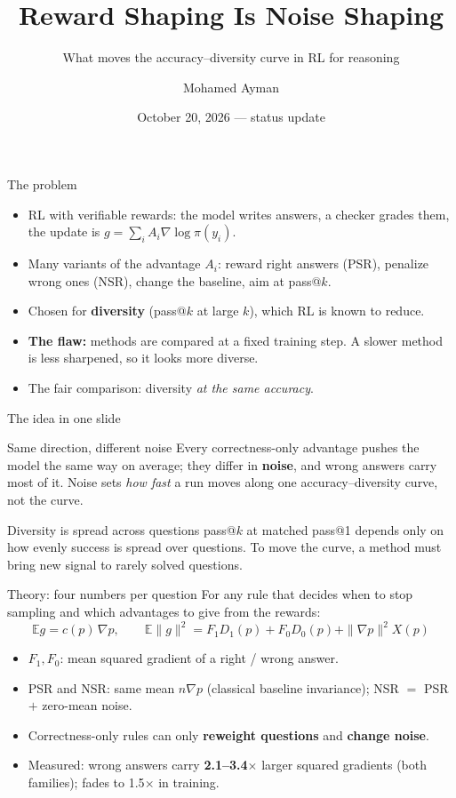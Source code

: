 \documentclass[aspectratio=169,11pt]{beamer}
\title{Reward Shaping Is Noise Shaping}
\subtitle{What moves the accuracy--diversity curve in RL for reasoning}
\author{Mohamed Ayman}
\date{October 20, 2026 --- status update}
\newcommand{\E}{\mathbb{E}}
\begin{document}
\frame{\titlepage}

\begin{frame}{The problem}
\begin{itemize}
\item RL with verifiable rewards: the model writes answers, a checker grades them, the update is $g=\sum_i A_i\nabla\log\pi(y_i)$.
\item Many variants of the advantage $A_i$: reward right answers (PSR), penalize wrong ones (NSR), change the baseline, aim at pass@$k$.
\item Chosen for \textbf{diversity} (pass@$k$ at large $k$), which RL is known to reduce.
\item \textbf{The flaw:} methods are compared at a fixed training step. A slower method is less sharpened, so it looks more diverse.
\item The fair comparison: diversity \emph{at the same accuracy}.
\end{itemize}
\end{frame}

\begin{frame}{The idea in one slide}
\begin{block}{Same direction, different noise}
Every correctness-only advantage pushes the model the same way on average; they differ in \textbf{noise}, and wrong answers carry most of it. Noise sets \emph{how fast} a run moves along one accuracy--diversity curve, not the curve.
\end{block}
\begin{block}{Diversity is spread across questions}
pass@$k$ at matched pass@1 depends only on how evenly success is spread over questions. To move the curve, a method must bring new signal to rarely solved questions.
\end{block}
\end{frame}

\begin{frame}{Theory: four numbers per question}
For any rule that decides when to stop sampling and which advantages to give from the rewards:
\[\E g=c(p)\,\nabla p,\qquad \E\|g\|^2=F_1D_1(p)+F_0D_0(p)+\|\nabla p\|^2X(p)\]
\begin{itemize}
\item $F_1,F_0$: mean squared gradient of a right / wrong answer.
\item PSR and NSR: same mean $n\nabla p$ (classical baseline invariance); NSR $=$ PSR $+$ zero-mean noise.
\item Correctness-only rules can only \textbf{reweight questions} and \textbf{change noise}.
\item Measured: wrong answers carry \textbf{2.1--3.4$\times$} larger squared gradients (both families); fades to 1.5$\times$ in training.
\end{itemize}
\end{frame}
\end{document}
